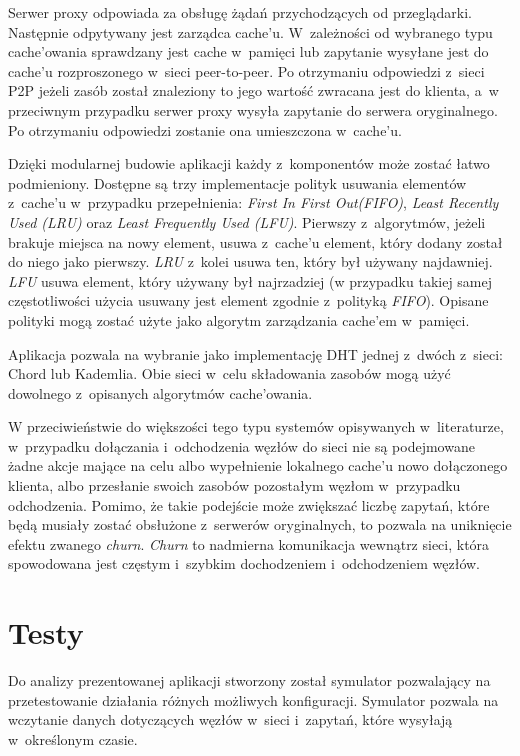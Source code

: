 \documentclass[a4paper,11pt]{scrartcl}
\newcommand{\s}{ }
\newcommand{\kesz}{cache}
\newcommand{\keszem}{cache'em}
\newcommand{\keszu}{cache'u}
\newcommand{\keszowania}{cache'owania}
\begin{document}
Serwer proxy odpowiada za obsługę żądań przychodzących od przeglądarki. Następnie odpytywany jest zarządca \keszu. W~zależności od wybranego typu \keszowania\s sprawdzany jest \kesz\s w~pamięci lub zapytanie wysyłane jest do \keszu\s rozproszonego w~sieci peer-to-peer. Po otrzymaniu odpowiedzi z~sieci P2P jeżeli zasób został znaleziony to jego wartość zwracana jest do klienta, a~w przeciwnym przypadku serwer proxy wysyła zapytanie do serwera oryginalnego. Po otrzymaniu odpowiedzi zostanie ona umieszczona w~\keszu.

Dzięki modularnej budowie aplikacji każdy z~komponentów może zostać łatwo podmieniony. Dostępne są trzy implementacje polityk usuwania elementów z~\keszu\s w~przypadku przepełnienia: \textit{First In First Out(FIFO)}, \textit{Least Recently Used (LRU)} oraz \textit{Least Frequently Used (LFU)}. Pierwszy z~algorytmów, jeżeli brakuje miejsca na nowy element, usuwa z~\keszu\s element, który dodany został do niego jako pierwszy. \textit{LRU} z~kolei usuwa ten, który był używany najdawniej. \textit{LFU} usuwa element, który używany był najrzadziej (w przypadku takiej samej częstotliwości użycia usuwany jest element zgodnie z~polityką \textit{FIFO}). Opisane polityki mogą zostać użyte jako algorytm zarządzania \keszem\s w~pamięci. 

Aplikacja pozwala na wybranie jako implementację DHT jednej z~dwóch z~sieci: Chord lub Kademlia. Obie sieci w~celu składowania zasobów mogą użyć dowolnego z~opisanych algorytmów \keszowania.

W przeciwieństwie do większości tego typu systemów opisywanych w~literaturze, w~przypadku dołączania i~odchodzenia węzłów do sieci nie są podejmowane żadne akcje mające na celu albo wypełnienie lokalnego \keszu\s nowo dołączonego klienta, albo przesłanie swoich zasobów pozostałym węzłom w~przypadku odchodzenia. Pomimo, że takie podejście może zwiększać liczbę zapytań, które będą musiały zostać obsłużone z~serwerów oryginalnych, to pozwala na uniknięcie efektu zwanego \textit{churn}. \textit{Churn} to nadmierna komunikacja wewnątrz sieci, która spowodowana jest częstym i~szybkim dochodzeniem i~odchodzeniem węzłów.  

\section{Testy}
\label{sect_tests}
Do analizy prezentowanej aplikacji stworzony został symulator pozwalający na przetestowanie działania różnych możliwych konfiguracji. Symulator pozwala na wczytanie danych dotyczących węzłów w~sieci i~zapytań, które wysyłają w~określonym czasie. 
\end{document}
